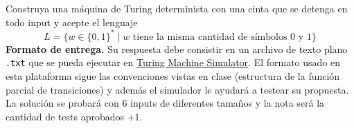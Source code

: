 Construya una máquina de Turing determinista con una cinta que se detenga en todo input y acepte el lenguaje 
$$L=\{w\in \{0,1\}^*\mid w\text{ tiene la misma cantidad de símbolos }0\text{ y }1\}$$
\textbf{Formato de entrega.} Su respuesta debe consistir en un archivo de texto plano \texttt{.txt} que se pueda ejecutar en \href{https://turingmachinesimulator.com/}{Turing Machine Simulator}. El formato usado en esta plataforma sigue las convenciones vistas en clase (estructura de la función parcial de transiciones) y además el simulador le ayudará a testear su propuesta. La solución se probará con 6 inputs de diferentes tamaños y la nota será la cantidad de tests aprobados $+1$.